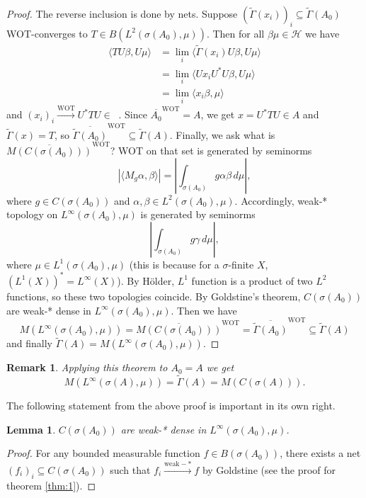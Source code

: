 \documentclass[10pt, a4paper]{article}
\newtheorem*{remark}{Remark}
\newtheorem{lemma}[thm]{Lemma}
\newenvironment{noticeC}{%
  \tcolorbox[%
  notitle,
  empty,
  enhanced,  %
  breakable,
  coltext=black, 
  fontupper=\rmfamily,
  noparskip,
  sharp corners,
  boxrule=-1pt,  %
  frame hidden,
  left=7pt,  %
  right=7pt,
  top=5pt,
  bottom=5pt,
  before skip=2.5ex plus 2pt,
  after skip=2.5ex plus 2pt,
  overlay unbroken and last={%
  },
  ]}
{\endtcolorbox}
\newenvironment{myproof}%
  {\begin{noticeC}\begin{proof}}%
  {\end{proof}\end{noticeC}}
\DeclareMathOperator{\bh}{\mathcal{B} (\mathcal{H})}
\begin{document}
\begin{myproof}
  The reverse inclusion is done by nets. Suppose $(\widetilde{\Gamma} (x_i))_i \subseteq \widetilde{\Gamma} (A_0)$
  WOT-converges to $T \in B(L^2 (\sigma(A_0), \mu))$. Then for all $\beta \mu \in \mathcal{H}$ we have 
  \begin{align*}
    \langle TU \beta, U\mu\rangle &= \lim_{i} \langle \widetilde{\Gamma} (x_i) U\beta, U\mu\rangle\\
    &= \lim_i \langle Ux_i U^* U \beta, U\mu \rangle\\
    &= \lim_i \langle x_i \beta, \mu \rangle
  \end{align*} 
  and $(x_i)_i \xrightarrow{\mathrm{WOT}} U^* T U \in \bh$.
  Since $\overline{A_0} ^{\mathrm{WOT}} = A$, we get $x = U^* T U \in A$ and $\widetilde{\Gamma}(x) = T$, so $\overline{\widetilde{\Gamma} (A_0)}^{\mathrm{WOT}} \subseteq \widetilde{\Gamma} (A)$.
  Finally, we ask what is $\overline{M(C(\sigma(A_0)))}^{\mathrm{WOT}}$?
  WOT on that set is generated by seminorms $$|\langle M_g \alpha, \beta\rangle| = \left| \int_{\sigma(A_0)} g \alpha \beta\, d\mu \right|,$$
  where $g \in C(\sigma(A_0))$ and $\alpha, \beta \in L^2 (\sigma(A_0), \mu)$.
  Accordingly, weak-* topology on $L^\infty (\sigma(A_0), \mu)$ is generated by 
  seminorms 
  $$\left| \int_{\sigma(A_0)} g \gamma\, d\mu \right|,$$
  where $\mu \in L^1 (\sigma(A_0), \mu)$ (this is because for a $\sigma$-finite $X$, $(L^1(X))^* = L^\infty (X)$).
  By Hölder, $L^1$ function is a product of two $L^2$ functions,
  so these two topologies coincide.
  By Goldstine's theorem, $C(\sigma(A_0))$ are weak-* dense in $L^\infty (\sigma(A_0), \mu)$.
  Then we have 
  $$M(L^\infty (\sigma(A_0), \mu)) = \overline{M(C(\sigma(A_0)))}^{\mathrm{WOT}} = \overline{\widetilde{\Gamma} (A_0)}^{\mathrm{WOT}} \subseteq \widetilde{\Gamma} (A)$$
  and finally $\widetilde{\Gamma} (A) = M(L^\infty (\sigma(A_0), \mu))$.
\end{myproof}

\begin{remark}
  Applying this theorem to $A_0 = A$ we get 
  $$ M(L^{\infty} (\sigma(A), \mu)) = \widetilde{\Gamma} (A) = M(C(\sigma(A))).$$
\end{remark}

The following statement from the above proof is important in its own right.

\begin{lemma}
  $C(\sigma(A_0))$ are weak-* dense in $L^{\infty} (\sigma(A_0), \mu)$.
\end{lemma}

\begin{myproof}
  For any bounded measurable function $f \in B(\sigma(A_0))$, there exists a net $(f_i)_i \subseteq C(\sigma(A_0))$
  such that $f_i \xrightarrow{\mathrm{weak-*}} f$ by Goldstine (see the proof for theorem \ref{thm:1}).
\end{myproof}
\end{document}
